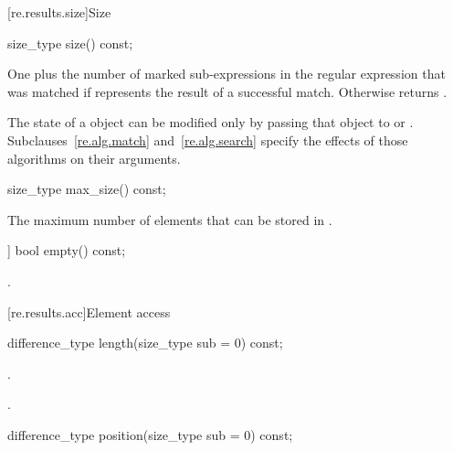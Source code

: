 [re.results.size]{Size}

%
\begin{itemdecl}
size_type size() const;
\end{itemdecl}

\begin{itemdescr}
\pnum
\returns
One plus the number of marked sub-expressions in the
regular expression that was matched if  represents the
result of a successful match.  Otherwise returns .
\begin{note}
The state of a  object can be modified
only by passing that object to  or .
Subclauses~\ref{re.alg.match} and~\ref{re.alg.search} specify the
effects of those algorithms on their  arguments.
\end{note}
\end{itemdescr}

%
\begin{itemdecl}
size_type max_size() const;
\end{itemdecl}

\begin{itemdescr}
\pnum
\returns
The maximum number of  elements that can be
stored in .
\end{itemdescr}

%
\begin{itemdecl}
[[nodiscard]] bool empty() const;
\end{itemdecl}

\begin{itemdescr}
\pnum
\returns
{}.
\end{itemdescr}

[re.results.acc]{Element access}

%
\begin{itemdecl}
difference_type length(size_type sub = 0) const;
\end{itemdecl}

\begin{itemdescr}
\pnum
\expects
{}.

\pnum
\returns
{}.
\end{itemdescr}

%
\begin{itemdecl}
difference_type position(size_type sub = 0) const;
\end{itemdecl}

